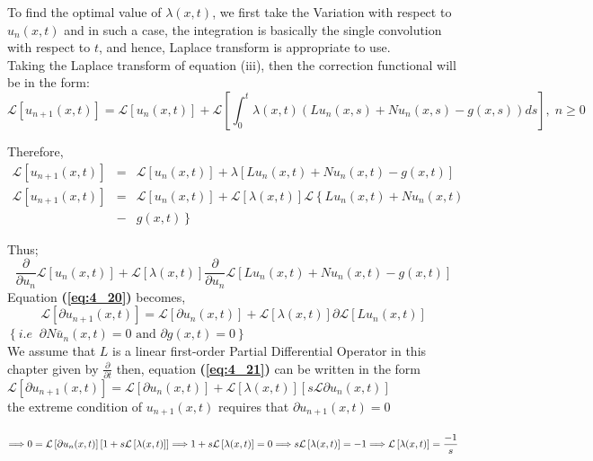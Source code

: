 \documentclass[12pt]{report}
\newcommand{\Laplace}{\mathcal{L}}
\newcommand{\sbracket}[1]{\left[#1\right]}
\newcommand{\Un}[2]{u_{#1}(#2)}
\newcommand{\NI}{\noindent}
\newcommand{\LT}[1]{\Laplace \left[#1\right]}
\newcommand{\bt}[1]{\textbf{#1}}
\newcommand{\refn}[1]{\bt{(\ref{#1})}}
\begin{document}
\NI To find the optimal value of $\lambda(x,t)$, we first take the Variation with respect to $\Un{n}{x,t}$ and in such a case, the integration is basically the single convolution with respect to $t$, and hence, Laplace transform  is appropriate to use.\\

\NI Taking the Laplace transform of equation (iii), then the correction functional will be in the form:\\[0.25cm]
\begin{equation}
	\LT{\Un{n+1}{x,t}} = \LT{\Un{n}{x,t}} + \LT{\int_{0}^{t}\lambda(x,t)\left( L\Un{n}{x,s} + N\Un{n}{x,s} - g(x,s) \right)ds}, \; n \geq 0
\end{equation}

\NI Therefore, 
\begin{eqnarray}
	\LT{\Un{n+1}{x,t}} &=& \LT{\Un{n}{x,t}} + \lambda \sbracket{L\Un{n}{x,t} + N\Un{n}{x,t} - g(x,t)}\\
	\LT{\Un{n+1}{x,t}} &=& \LT{\Un{n}{x,t}} + \LT{\lambda(x,t)} \Laplace\left\{L\Un{n}{x,t} + N\Un{n}{x,t}\right. \nonumber \\
	 &-& \left. g(x,t)\right\}
\end{eqnarray}


\NI Thus;\\
\begin{equation}
	\frac{\partial}{\partial u_n}\LT{\Un{n}{x,t}} + \LT{\lambda(x,t)}\frac{\partial}{\partial u_n}\LT{L\Un{n}{x,t} + N\Un{n}{x,t} - g(x,t)} \label{eq:4_20}
\end{equation}
Equation \refn{eq:4_20} becomes,\\[0.2cm]
\begin{equation}
	\LT{\partial\Un{n+1}{x,t}} = \LT{\partial u_n(x,t)} + \LT{\lambda (x,t)}\partial \LT{L\Un{n}{x,t}} \label{eq:4_21}
\end{equation}
$\displaystyle
\left\{ i.e \; \; \partial N\bar{u}_{n}(x,t) = 0 \text{ and } \partial g(x,t) = 0\right\}
$\\[0.2cm]

\NI We assume that $L$ is a linear first-order Partial Differential Operator in this chapter given by $\displaystyle \frac{\partial}{\partial t}$ then, equation \refn{eq:4_21} can be written in the form\\[0.2cm]
$\displaystyle
\LT{\partial\Un{n+1}{x,t}} = \LT{\partial\Un{n}{x,t}} + \LT{\lambda(x,t)}\sbracket{s\Laplace \partial\Un{n}{x,t}}
$\\[0.2cm]
the extreme condition of $\Un{n+1}{x,t}$ requires that $\partial\Un{n+1}{x,t} = 0$\\[0.2cm]\
$\displaystyle
\Longrightarrow 0 = \LT{\partial\Un{n}{x,t}}\left[1 + s\LT{\lambda(x,t)}\right] \\[0.2cm]
\Longrightarrow 1 + s\LT{\lambda(x,t)} = 0 \\[0.2cm]
\Longrightarrow s\LT{\lambda(x,t)} = - 1 \\[0.2cm]
\Longrightarrow \LT{\lambda(x,t)} = \frac{-1}{s}
$\\[0.2cm]
\end{document}
